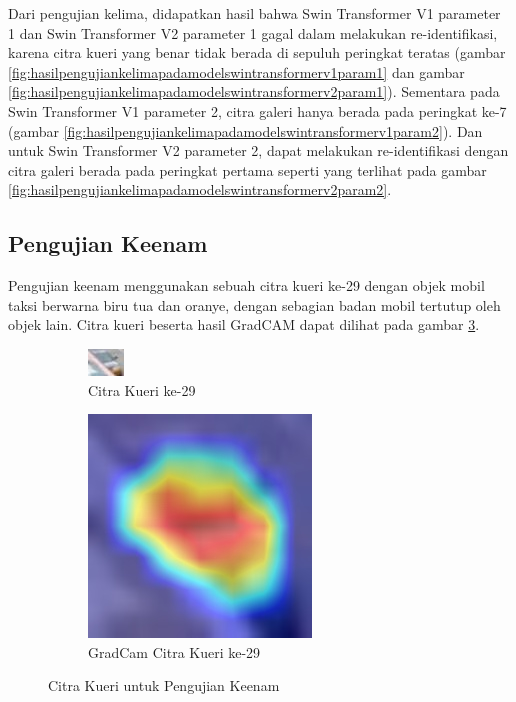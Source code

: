 Dari pengujian kelima, didapatkan hasil bahwa Swin Transformer V1 parameter 1 dan Swin Transformer V2 parameter 1 
gagal dalam melakukan re-identifikasi, karena citra kueri yang benar tidak berada di sepuluh peringkat teratas (gambar 
\ref{fig:hasilpengujiankelimapadamodelswintransformerv1param1} dan gambar 
\ref{fig:hasilpengujiankelimapadamodelswintransformerv2param1}). Sementara pada Swin Transformer V1 parameter 2, citra 
galeri hanya berada pada peringkat ke-7 (gambar \ref{fig:hasilpengujiankelimapadamodelswintransformerv1param2}). 
Dan untuk Swin Transformer V2 parameter 2, dapat melakukan 
re-identifikasi dengan citra galeri berada pada peringkat pertama seperti yang terlihat pada gambar 
\ref{fig:hasilpengujiankelimapadamodelswintransformerv2param2}.

\subsection{Pengujian Keenam}

Pengujian keenam menggunakan sebuah citra kueri ke-29 dengan objek mobil taksi \linebreak berwarna biru tua dan oranye, dengan sebagian 
badan mobil tertutup oleh objek lain. Citra kueri beserta hasil GradCAM dapat dilihat pada gambar 
\ref{fig:gambarkueriuntukpengujiankeenam}.

\begin{figure}[h!]
  \centering
  \begin{subfigure}{.5\textwidth}
    \centering
    \includegraphics[width=.4\linewidth]{gambar/Que29_1060.jpg}
    \caption{Citra Kueri ke-29}
    \label{gambarkuerinomorduasembilan}
  \end{subfigure}%
  \begin{subfigure}{.5\textwidth}
    \centering
    \includegraphics[width=.4\linewidth]{gambar/GradCamQue29_1060.jpg}
    \caption{GradCam Citra Kueri ke-29}
    \label{gradcamgambarkuerinomorduasembilan}
  \end{subfigure}
  \caption{Citra Kueri untuk Pengujian Keenam}
  \label{fig:gambarkueriuntukpengujiankeenam}
\end{figure}

